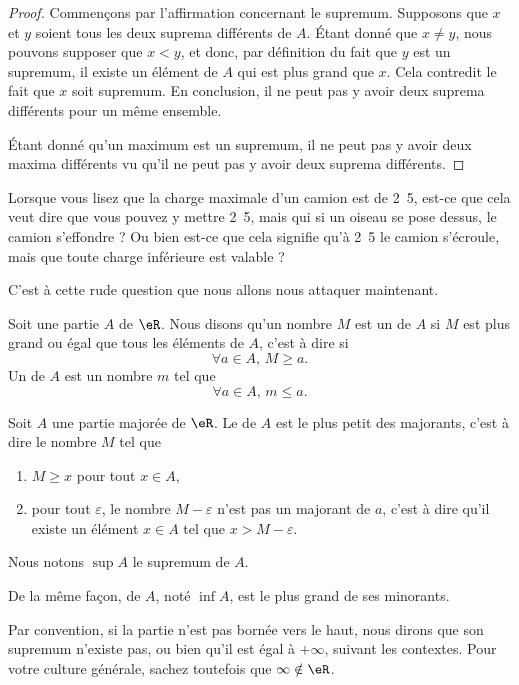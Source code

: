 \begin{proof}
Commençons par l'affirmation concernant le supremum. Supposons que $x$ et $y$ soient tous les deux suprema différents de $A$. Étant donné que $x\neq y$, nous pouvons supposer que $x<y$, et donc, par définition du fait que $y$ est un supremum, il existe un élément de $A$ qui est plus grand que $x$. Cela contredit le fait que $x$ soit supremum. En conclusion, il ne peut pas y avoir deux suprema différents pour un même ensemble.

Étant donné qu'un maximum est un supremum, il ne peut pas y avoir deux maxima différents vu qu'il ne peut pas y avoir deux suprema différents.
\end{proof}


Lorsque vous lisez que la charge maximale d'un camion est de \unit{2.5}{\ton}, est-ce que cela veut dire que vous pouvez y mettre \unit{2.5}{\ton}, mais qui si un oiseau se pose dessus, le camion s'effondre ? Ou bien est-ce que cela signifie qu'à \unit{2.5}{\ton} le camion s'écroule, mais que toute charge inférieure est valable ?

C'est à cette rude question que nous allons nous attaquer maintenant.

\begin{definition}
Soit une partie $A$ de $\eR$. Nous disons qu'un nombre $M$ est un  de $A$ si $M$ est plus grand ou égal que tous les éléments de $A$, c'est à dire si
\begin{equation}
	\forall a\in A,\, M\geq a.
\end{equation}
Un  de $A$ est un nombre $m$ tel que 
\begin{equation}
	\forall a\in A,\, m\leq a.
\end{equation}
\end{definition}

\begin{definition}		\label{DefSupeA}
Soit $A$ une partie majorée de $\eR$. Le  de $A$ est le plus petit des majorants, c'est à dire le nombre $M$ tel que
\begin{enumerate}
	\item
		$M\geq x$ pour tout $x\in A$,
	\item
		pour tout $\varepsilon$, le nombre $M-\varepsilon$ n'est pas un majorant de $a$, c'est à dire qu'il existe un élément $x\in A$ tel que $x>M-\varepsilon$.
\end{enumerate}
Nous notons $\sup A$ le supremum de $A$.

De la même façon,  de $A$, noté $\inf A$, est le plus grand de ses minorants. 
\end{definition}
Par convention, si la partie n'est pas bornée vers le haut, nous dirons que son supremum n'existe pas, ou bien qu'il est égal à $+\infty$, suivant les contextes. Pour votre culture générale, sachez toutefois que $\infty\notin\eR$.

